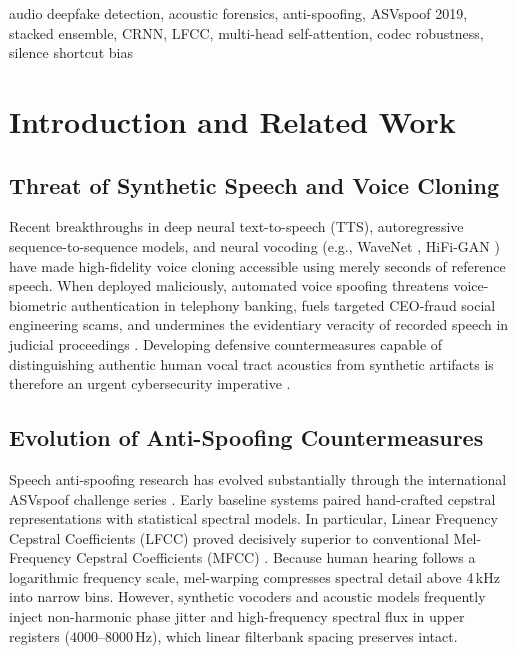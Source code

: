 \documentclass[conference]{IEEEtran}
\begin{document}
\begin{IEEEkeywords}
audio deepfake detection, acoustic forensics, anti-spoofing, ASVspoof 2019, stacked ensemble, CRNN, LFCC, multi-head self-attention, codec robustness, silence shortcut bias
\end{IEEEkeywords}

\section{Introduction and Related Work}

\subsection{Threat of Synthetic Speech and Voice Cloning}
Recent breakthroughs in deep neural text-to-speech (TTS), autoregressive sequence-to-sequence models, and neural vocoding (e.g., WaveNet \cite{oord2016wavenet}, HiFi-GAN \cite{kong2020hifi}) have made high-fidelity voice cloning accessible using merely seconds of reference speech. When deployed maliciously, automated voice spoofing threatens voice-biometric authentication in telephony banking, fuels targeted CEO-fraud social engineering scams, and undermines the evidentiary veracity of recorded speech in judicial proceedings \cite{wang2020asvspoof,muller2022does}. Developing defensive countermeasures capable of distinguishing authentic human vocal tract acoustics from synthetic artifacts is therefore an urgent cybersecurity imperative \cite{todisco2019asvspoof,kinnunen2020tandem}.

\subsection{Evolution of Anti-Spoofing Countermeasures}
Speech anti-spoofing research has evolved substantially through the international ASVspoof challenge series \cite{wang2020asvspoof,todisco2019asvspoof}. Early baseline systems paired hand-crafted cepstral representations with statistical spectral models. In particular, Linear Frequency Cepstral Coefficients (LFCC) proved decisively superior to conventional Mel-Frequency Cepstral Coefficients (MFCC) \cite{sahidullah2015comparison}. Because human hearing follows a logarithmic frequency scale, mel-warping compresses spectral detail above 4\,kHz into narrow bins. However, synthetic vocoders and acoustic models frequently inject non-harmonic phase jitter and high-frequency spectral flux in upper registers ($4000\text{--}8000\,\text{Hz}$), which linear filterbank spacing preserves intact.
\end{document}
